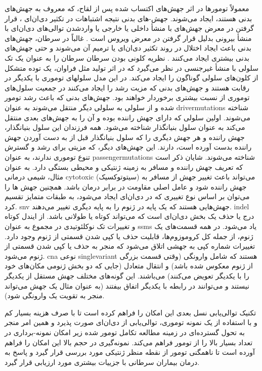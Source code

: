 معمولاً تومورها در اثر جهش‌های اکتساب شده پس از لقاح، که معروف به جهش‌های بدنی هستند، ایجاد می‌شوند. جهش-های بدنی نتیجه اشتباهات در تکثیر دی‌ان‌ای \cite{behjati2014genome}، قرار گرفتن در معرض جهش‌های با منشأ داخلی یا خارجی یا وارد‌شدن توالی‌های دی‌ان‌ای با منشأ بیرونی بدلیل قرار گرفتن در معرض ویروس است \cite{talbot2004viruses}. غالباً در سرطان، جهش‌های بدنی باعث ایجاد اختلال در روند تکثیر دی‌ان‌ای یا ترمیم آن می‌شوند و حتی جهش‌های بدنی بیشتری ایجاد می‌کنند \cite{stratton2009cancer}. نظریه کلونی بودن سرطان \cite{nowell1976clonal} سرطان را به عنوان یک تک سلولی با منشأ غیرجنسی در نظر می‌گیرد که در اثر تولید مثل فراوان، یک توده متشکل از کلون‌های سلولی گوناگون را ایجاد می‌کند. در این مدل سلولهای توموری با یکدیگر در رقابت هستند و جهش‌های بدنی که مزیت رشد را ایجاد می‌کنند در جمعیت سلول‌های توموری از نسبت بیشتری برخوردار خواهند بود. جهش‌های بدنی که باعث رشد تومور شده و از سلولی به سلولی دیگر منتقل می‌شوند به عنوان \glspl{drivermutation} شناخته می‌شوند. اولین سلولی که دارای جهش راننده بوده و آن را به جهش‌های بعدی منتقل می‌کند به عنوان سلول بنیانگذار شناخته می‌شود. همه فرزندان این سلول بنیانگذار، جهش راننده و هر جهش دیگری را که سلول بنیانگذار قبل از به دست آوردن جهش راننده بدست آورده است، دارند. این جهش‌های دیگر، که مزیتی برای رشد و گسترش تنوع توموری ندارند، به عنوان \glspl{passengermutation} شناخته می‌شوند. شایان ذکر است که تعریف جهش راننده و مسافر به زمینه ژنتیکی و محیطی بستگی دارد. به عنوان مثال، شیمی درمانی \gls{cytotoxic}  (سیتوتوکسیک) می‌تواند باعث تغییر جهش از مسافر به جهش راننده شود و عامل اصلی مقاومت در برابر درمان باشد. همچنین جهش ها را می‌توان بر اساس نوع تغییری که در دی‌ان‌ای ایجاد می‌شود، به طبقات متمایز تقسیم کرد. \gls{snv} جهش‌هایی هستند که یک پایه در ژنوم را به پایه دیگری تغییر می‌دهند. \gls{indel}  درج یا حذف یک بخش دی‌ان‌ای است که می‌تواند کوتاه یا طولانی باشد. از ایندل کوتاه و تغییرات تک نوکلئوتیدی در مجموع به عنوان \glspl{ssm}  یاد می‌شود. در همه قسمت‌های یک ژنوم، از جمله کل کروموزوم‌ها، قابلیت حذف یا کپی شدن قسمتی از ژنوم وجود دارد. تغییرات شماره کپی  به جهشی اتلاق می‌شود که منجر به حذف یا کپی شدن قسمتی از ژنوم می‌شود. \gls{cna} نوعی \gls{singlevariant} هستند که شامل وارونگی (وقتی قسمت بزرگی از ژنوم معکوس شده باشد) و انتقال متعادل (جایی که دو بخش ژنومی مکان‌‌های خود را با یکدیگر تعویض می‌کنند) می‌باشند\cite{stratton2009cancer}. این گونه‌های مختلف جهش مستقل از یکدیگر نیستند و می‌توانند در رابطه با یکدیگر اتفاق بیفتند (به عنوان مثال یک جهش می‌تواند منجر به تقویت یک وارونگی شود). 



تکنیک توالی‌یابی نسل بعدی این امکان را فراهم کرده است تا با صرف هزینه بسیار کم و با استفاده از یک نمونه توموری، توالی‌یابی از دی‌ان‌ای صورت پذیرد و همین امر منجر به تحول گسترده‌ای در زمینه مطالعه تکامل تومور شده زیر امکان نمونه-برداری در تعداد بسیار بالا را از تومور فراهم می‌کند. نمونه‌گیری در حجم بالا این امکان را فراهم آورده است تا ناهمگنی تومور از نقطه منظر ژنتیکی مورد بررسی قرار گیرد و پاسخ به درمان بیماران سرطانی با جزییات بیشتری مورد ارزیابی قرار گیرد.


